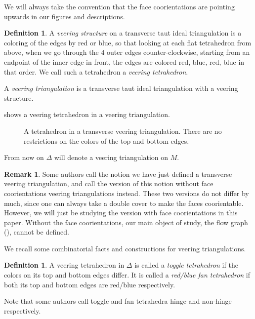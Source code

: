 \documentclass[12pt]{amsart}
\theoremstyle{definition}
\newtheorem{defn}[thm]{Definition}
\newtheorem{rmk}[thm]{Remark}
\numberwithin{equation}{section}
\begin{document}
We will always take the convention that the face coorientations are pointing upwards in our figures and descriptions.

\begin{defn} \label{defn:veertri}
A \textit{veering structure} on a transverse taut ideal triangulation is a coloring of the edges by red or blue, so that looking at each flat tetrahedron from above, when we go through the 4 outer edges counter-clockwise, starting from an endpoint of the inner edge in front, the edges are colored red, blue, red, blue in that order. We call such a tetrahedron a \textit{veering tetrahedron}.

A \textit{veering triangulation} is a transverse taut ideal triangulation with a veering structure.
\end{defn}

 shows a veering tetrahedron in a veering triangulation.

\begin{figure} 
    \centering
    \fontsize{14pt}{14pt}\selectfont
    \resizebox{!}{4cm}{}
    \caption{A tetrahedron in a transverse veering triangulation. There are no restrictions on the colors of the top and bottom edges.} 
    \label{fig:veertet}
\end{figure}

From now on $\Delta$ will denote a veering triangulation on $M$.

\begin{rmk} \label{rmk:transverse}
Some authors call the notion we have just defined a transverse veering triangulation, and call the version of this notion without face coorientations veering triangulations instead. These two versions do not differ by much, since one can always take a double cover to make the faces coorientable. However, we will just be studying the version with face coorientations in this paper. Without the face coorientations, our main object of study, the flow graph (), cannot be defined.
\end{rmk}

We recall some combinatorial facts and constructions for veering triangulations.

\begin{defn} \label{defn:fantet}
A veering tetrahedron in $\Delta$ is called a \textit{toggle tetrahedron} if the colors on its top and bottom edges differ. It is called a \textit{red/blue fan tetrahedron} if both its top and bottom edges are red/blue respectively.

Note that some authors call toggle and fan tetrahedra hinge and non-hinge respectively.
\end{defn}
\end{document}
